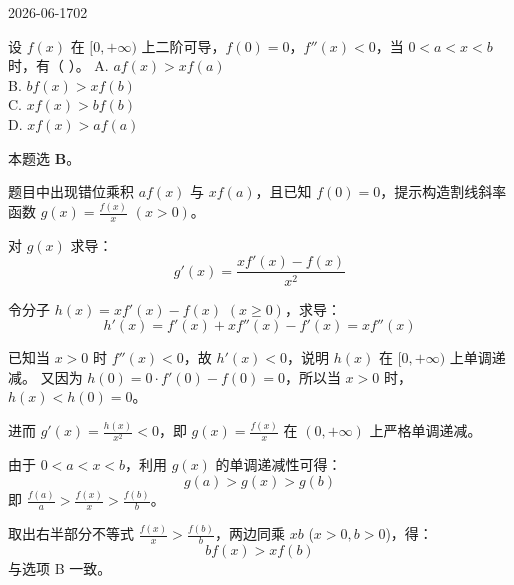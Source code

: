 \begin{mistake}{2026-06-17}{02}

\begin{problemcontent}
设 \(f(x)\) 在 \([0, +\infty)\) 上二阶可导，\(f(0) = 0\)，\(f''(x) < 0\)，当 \(0 < a < x < b\) 时，有（  ）。
A. \(a f(x) > x f(a)\) \\
B. \(b f(x) > x f(b)\) \\
C. \(x f(x) > b f(b)\) \\
D. \(x f(x) > a f(a)\)
\end{problemcontent}

\begin{solutioncontent}
本题选 \textbf{B}。

题目中出现错位乘积 \(a f(x)\) 与 \(x f(a)\)，且已知 \(f(0)=0\)，提示构造割线斜率函数 \(g(x) = \frac{f(x)}{x}\) \((x > 0)\)。

对 \(g(x)\) 求导：
\[
g'(x) = \frac{x f'(x) - f(x)}{x^2}
\]

令分子 \(h(x) = x f'(x) - f(x)\) \((x \ge 0)\)，求导：
\[
h'(x) = f'(x) + x f''(x) - f'(x) = x f''(x)
\]

已知当 \(x > 0\) 时 \(f''(x) < 0\)，故 \(h'(x) < 0\)，说明 \(h(x)\) 在 \([0, +\infty)\) 上单调递减。
又因为 \(h(0) = 0 \cdot f'(0) - f(0) = 0\)，所以当 \(x > 0\) 时，\(h(x) < h(0) = 0\)。

进而 \(g'(x) = \frac{h(x)}{x^2} < 0\)，即 \(g(x) = \frac{f(x)}{x}\) 在 \((0, +\infty)\) 上严格单调递减。

由于 \(0 < a < x < b\)，利用 \(g(x)\) 的单调递减性可得：
\[
g(a) > g(x) > g(b)
\]
即 \(\frac{f(a)}{a} > \frac{f(x)}{x} > \frac{f(b)}{b}\)。

取出右半部分不等式 \(\frac{f(x)}{x} > \frac{f(b)}{b}\)，两边同乘 \(xb\) (\(x>0, b>0\))，得：
\[
b f(x) > x f(b)
\]
与选项 B 一致。
\end{solutioncontent}


\end{mistake}
